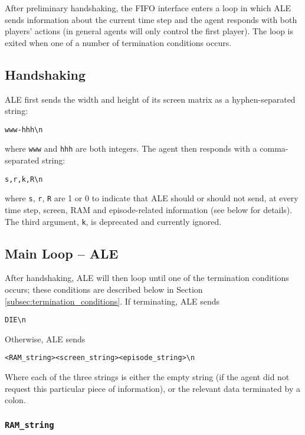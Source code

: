 \documentclass[12pt]{article}
\begin{document}
After preliminary handshaking, the FIFO interface enters a loop in which ALE sends information about the current time step and the agent responds with both players' actions (in general agents will only control the first player). The loop is exited when one of a number of termination conditions occurs.

\subsection{Handshaking}

ALE first sends the width and height of its screen matrix as a hyphen-separated string:

\begin{verbatim}
www-hhh\n
\end{verbatim}

\noindent where \verb+www+ and \verb+hhh+ are both integers. The agent then responds with a comma-separated string:

\begin{verbatim}
s,r,k,R\n
\end{verbatim}

\noindent where \verb+s+, \verb+r+, \verb+R+ are 1 or 0 to indicate that ALE should or should not send, at every time step, screen, RAM and episode-related information (see below for details). The third argument, \verb+k+, is deprecated and currently ignored.

\subsection{Main Loop -- ALE}

After handshaking, ALE will then loop until one of the termination conditions occurs; these conditions are described below in Section \ref{subsec:termination_conditions}. If terminating, ALE sends

\begin{verbatim}
DIE\n
\end{verbatim}

Otherwise, ALE sends

\begin{verbatim}
<RAM_string><screen_string><episode_string>\n
\end{verbatim}

Where each of the three strings is either the empty string (if the agent did not request this
particular piece of information), or the relevant data terminated by a colon.

\subsubsection{\texttt{RAM\_string}}
\end{document}
